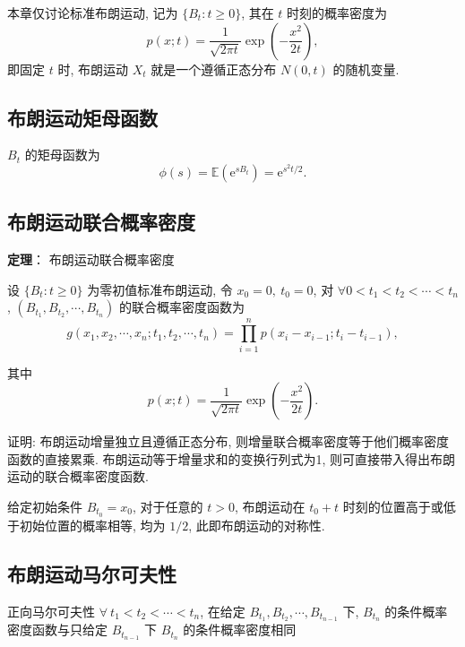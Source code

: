 \documentclass[openany]{ctexbook}
\theoremstyle{kaiti}
\theoremstyle{normal}
\begin{document}
本章仅讨论标准布朗运动, 记为 $\{B_t:t\geqslant0\}$, 其在 $t$ 时刻的概率密度为
\begin{equation}
  p(x;t)=\frac{1}{\sqrt{2\pi t}}\exp\left(-\frac{x^2}{2t}\right),
\end{equation}
 即固定 $t$ 时, 布朗运动 $X_t$ 就是一个遵循正态分布 $N(0,t)$ 的随机变量.

\subsection{布朗运动矩母函数}

$B_t$ 的矩母函数为
\begin{equation}
  \phi(s)=\mathbb{E}(\mathrm{e}^{sB_t})=\mathrm{e}^{s^2t/2}.
\end{equation}

\subsection{布朗运动联合概率密度}

\textbf{定理}： 布朗运动联合概率密度

设 $\{B_t:t\geqslant0\}$ 为零初值标准布朗运动, 令 $x_0=0,~t_0=0$, 对 $\forall 0<t_1<t_2<\cdots<t_n$, $(B_{t_1},B_{t_2},\cdots,B_{t_n})$ 的联合概率密度函数为
\begin{equation}
  g(x_1,x_2,\cdots,x_n;t_1,t_2,\cdots,t_n)=\prod_{i=1}^np(x_i-x_{i-1};t_i-t_{i-1}),
\end{equation}

其中
\begin{equation}
  p(x;t)=\frac{1}{\sqrt{2\pi t}}\exp\left(-\frac{x^2}{2t}\right).
\end{equation}

证明: 布朗运动增量独立且遵循正态分布, 则增量联合概率密度等于他们概率密度函数的直接累乘. 布朗运动等于增量求和的变换行列式为1, 则可直接带入得出布朗运动的联合概率密度函数.

给定初始条件 $B_{t_0}=x_0$, 对于任意的 $t>0$, 布朗运动在 $t_0+t$ 时刻的位置高于或低于初始位置的概率相等, 均为 $1/2$, 此即布朗运动的对称性.

\subsection{布朗运动马尔可夫性}

正向马尔可夫性
$\forall~t_1<t_2<\cdots<t_n$, 在给定 $B_{t_1},B_{t_2},\cdots,B_{t_{n-1}}$ 下, $B_{t_n}$ 的条件概率密度函数与只给定 $B_{t_{n-1}}$ 下 $B_{t_n}$ 的条件概率密度相同
\end{document}
